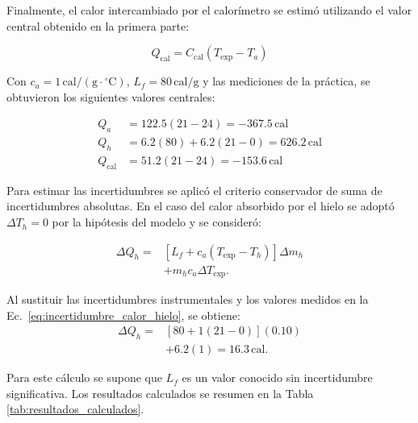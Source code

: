 Finalmente, el calor intercambiado por el calorímetro se estimó utilizando el valor central obtenido en la primera parte:

\begin{equation}
    Q_{\mathrm{cal}}=
    C_{\mathrm{cal}}(T_{\mathrm{exp}}-T_a)
    \label{eq:calor_del_calorimetro}
\end{equation}

Con $c_a=1\,\mathrm{cal}/(\mathrm{g}\cdot{}^{\circ}\mathrm{C})$, $L_f=80\,\mathrm{cal/g}$ y las mediciones de la práctica, se obtuvieron los siguientes valores centrales:

\begin{align*}
    Q_a&=122.5(21-24)=-367.5\,\mathrm{cal}\\
    Q_h&=6.2(80)+6.2(21-0)=626.2\,\mathrm{cal}\\
    Q_{\mathrm{cal}}&=51.2(21-24)=-153.6\,\mathrm{cal}
\end{align*}

Para estimar las incertidumbres se aplicó el criterio conservador de suma de incertidumbres absolutas. En el caso del calor absorbido por el hielo se adoptó $\Delta T_h=0$ por la hipótesis del modelo y se consideró:

\begin{equation}
    \begin{split}
    \Delta Q_h={}&[L_f+c_a(T_{\mathrm{exp}}-T_h)]\Delta m_h\\
      &+m_hc_a\Delta T_{\mathrm{exp}}.
    \end{split}
    \label{eq:incertidumbre_calor_hielo}
\end{equation}

Al sustituir las incertidumbres instrumentales y los valores medidos en la Ec.~\eqref{eq:incertidumbre_calor_hielo}, se obtiene:
\begin{equation*}
    \begin{split}
      \Delta Q_h={}&[80+1(21-0)](0.10)\\
                  &+6.2(1)=16.3\,\mathrm{cal}.
    \end{split}
\end{equation*}

Para este cálculo se supone que $L_f$ es un valor conocido sin incertidumbre significativa. Los resultados calculados se resumen en la Tabla \ref{tab:resultados_calculados}.

